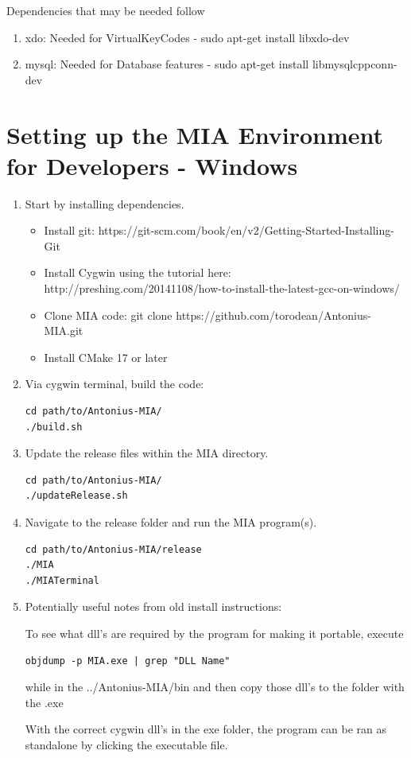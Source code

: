 Dependencies that may be needed follow
\begin{enumerate}
	\item xdo: Needed for VirtualKeyCodes - sudo apt-get install libxdo-dev
	\item mysql: Needed for Database features - sudo apt-get install libmysqlcppconn-dev 
\end{enumerate}

\section{Setting up the MIA Environment for Developers - Windows}

\begin{enumerate}
\item Start by installing dependencies.

\begin{itemize}
	\item Install git: https://git-scm.com/book/en/v2/Getting-Started-Installing-Git
	\item Install Cygwin using the tutorial here: http://preshing.com/20141108/how-to-install-the-latest-gcc-on-windows/
	\item Clone MIA code: git clone https://github.com/torodean/Antonius-MIA.git
	\item Install CMake 17 or later
\end{itemize}

\item Via cygwin terminal, build the code:  

\begin{lstlisting}
cd path/to/Antonius-MIA/
./build.sh
\end{lstlisting}

\item Update the release files within the MIA directory.

\begin{lstlisting}
cd path/to/Antonius-MIA/
./updateRelease.sh
\end{lstlisting}

\item Navigate to the release folder and run the MIA program(s).

\begin{lstlisting}
cd path/to/Antonius-MIA/release
./MIA
./MIATerminal
\end{lstlisting}

\item Potentially useful notes from old install instructions:

To see what dll's are required by the program for making it portable, execute 
\begin{lstlisting}
objdump -p MIA.exe | grep "DLL Name"
\end{lstlisting}
while in the ../Antonius-MIA/bin and then copy those dll's to the folder with the .exe

With the correct cygwin dll's in the exe folder, the program can be ran as standalone by clicking the executable file.
\end{enumerate}

